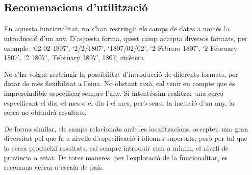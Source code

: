 \subsection{Recomenacions d'utilització}

    \paragraph{}
    En aquesta funcionalitat, no s'han restringit els camps de dates a només la introducció d'un any. D'aquesta forma, quest camp accepta diversos formats, per exemple: `02-02-1807', `2/2/1807', `1807/02/02', `2 Febrero 1807', `2 February 1807', `2 1807', `February 1807', 1807, etcètera.

    No s'ha volgut restringir la possibilitat d'introducció de diferents formats, per dotar de més flexibilitat a l'eina. No obstant això, cal tenir en compte que és imprescindible especificar sempre l'any. Si intentéssim realitzar una cerca especificant el dia, el mes o el dia i el mes, però sense la inclusió d'un any, la cerca no obtindrà resultats.

    De forma similar, els camps relacionats amb les localitzacions, accepten una gran diversitat pel que fa a nivells d'especificació i idiomes suportats, però per tal que la cerca produeixi resultats, cal sempre introduir com a mínim, el nivell de província o estat. De totes maneres, per l'exploració de la funcionalitat, es recomana cercar a escala de país.
